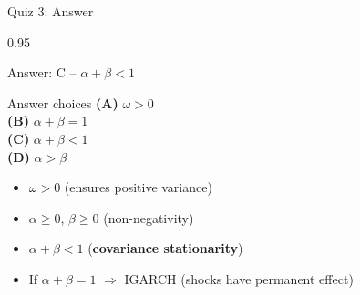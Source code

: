 \documentclass[9pt, aspectratio=169, t]{beamer}
\begin{document}
\begin{frame}{Quiz 3: Answer}
    \begin{cminipage}{0.95\textwidth}
    \begin{exampleblock}{Answer: C -- $\alpha + \beta < 1$}

    \vspace{0.1cm}

    \begin{block}{Answer choices}
        \textcolor{MainBlue}{\textbf{(A)}} $\omega > 0$ \incorrect\\[3pt]
        \textcolor{MainBlue}{\textbf{(B)}} $\alpha + \beta = 1$ \incorrect\\[3pt]
        \textcolor{MainBlue}{\textbf{(C)}} \textbf{\textcolor{Forest}{$\alpha + \beta < 1$}} \correct\\[3pt]
        \textcolor{MainBlue}{\textbf{(D)}} $\alpha > \beta$ \incorrect
    \end{block}

        \vspace{0.1cm}

        \begin{itemize}
            \item $\omega > 0$ (ensures positive variance)
            \item $\alpha \geq 0$, $\beta \geq 0$ (non-negativity)
            \item $\alpha + \beta < 1$ (\textbf{covariance stationarity})
            \item If $\alpha + \beta = 1$ $\Rightarrow$ IGARCH (shocks have permanent effect)
        \end{itemize}
    \end{exampleblock}

    \end{cminipage}
\end{frame}
\end{document}
